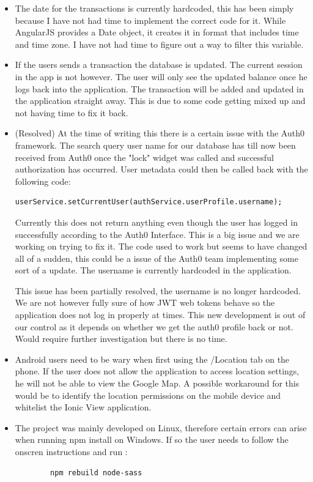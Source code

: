\begin{itemize}
\begin{center}
    \end{center}
    \item The date for the transactions is currently hardcoded, this has been simply because I have not had time to implement the correct code for it. While AngularJS provides a Date object, it creates it in format that includes time and time zone. I have not had time to figure out a way to filter this variable.
    \item If the users sends a transaction the database is updated. The current session in the app is not however. The user will only see the updated balance once he logs back into the application. The transaction will be added and updated in the application straight away.
    This is due to some code getting mixed up and not having time to fix it back.
    \item (Resolved) At the time of writing this there is a certain issue with the Auth0 framework.
    The search query user name for our database has till now been received from Auth0 once the "lock" widget was called and successful authorization has occurred. User metadata could then be called back with the following code:

\begin{verbatim}
userService.setCurrentUser(authService.userProfile.username);
\end{verbatim}
    Currently this does not return anything even though the user has logged in successfully according to the Auth0 Interface. This is a big issue and we are working on trying to fix it.
    The code used to work but seems to have changed all of a sudden, this could be a issue of the Auth0 team implementing some sort of a update. The username is currently hardcoded in the application.

    This issue has been partially resolved, the username is no longer hardcoded. We are not however fully sure of how JWT web tokens behave so the application does not log in properly at times. This new development is out of our control as it depends on whether we get the auth0 profile back or not. Would require further investigation but there is no time.

    \item Android users need to be wary when first using the /Location tab on the phone. If the user does not allow the application to access location settings, he will not be able to view the Google Map. A possible workaround for this would be to identify the location permissions on the mobile device and whitelist the Ionic View application.

    \item The project was mainly developed on Linux, therefore certain errors can arise when running npm install on Windows. If so the user needs to follow the onscren instructions and run :
    \begin{verbatim}
        npm rebuild node-sass
    \end{verbatim}


\end{itemize}
